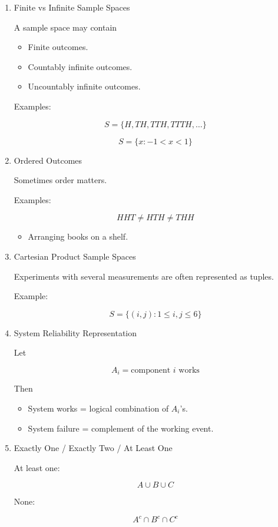 \documentclass[11pt]{article}
\begin{document}
\begin{enumerate}
\item Finite vs Infinite Sample Spaces
\label{sec:org185f631}

A sample space may contain

\begin{itemize}
\item Finite outcomes.
\item Countably infinite outcomes.
\item Uncountably infinite outcomes.
\end{itemize}

Examples:

\[
S=
\{H,TH,TTH,TTTH,\ldots\}
\]

\[
S=
\{x:-1<x<1\}
\]
\item Ordered Outcomes
\label{sec:org7774eb9}

Sometimes order matters.

Examples:

\[
HHT \neq HTH \neq THH
\]

\begin{itemize}
\item Arranging books on a shelf.
\end{itemize}
\item Cartesian Product Sample Spaces
\label{sec:orgf7e2eaf}

Experiments with several measurements are often represented as tuples.

Example:

\[
S=
\{(i,j):1\le i,j\le 6\}
\]
\item System Reliability Representation
\label{sec:org5c2e11e}

Let

\[
A_i
=
\text{component }i\text{ works}
\]

Then

\begin{itemize}
\item System works = logical combination of \(A_i\)'s.
\item System failure = complement of the working event.
\end{itemize}
\item Exactly One / Exactly Two / At Least One
\label{sec:orgaabe675}

At least one:

\[
A\cup B\cup C
\]

None:

\[
A^c\cap B^c\cap C^c
\]


\end{enumerate}
\end{document}
